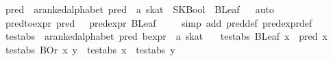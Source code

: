 \begin{isabellebody}
\isanewline
{}\isamarkupfalse%
\ pred\ {}{}\ {}{}a{}{}ranked{}alphabet\ pred\ {}\ {}a\ skat{}\ \ {}SKBool\ {}\ BLeaf{}%
\isadelimproof
\ %
\endisadelimproof
%
\isatagproof
{}\isamarkupfalse%
\ auto%
\endisatagproof
{\isafoldproof}%
%
\isadelimproof
%
\endisadelimproof
\isanewline
\isanewline
{}\isamarkupfalse%
\ pred{}to{}expr{}\ {}pred\ {}\ {}\ pred{}expr\ {}BLeaf\ {}{}{}\isanewline
%
\isadelimproof
\ \ %
\endisadelimproof
%
\isatagproof
{}\isamarkupfalse%
\ {}simp\ add{}\ pred{}def\ pred{}expr{}def{}%
\endisatagproof
{\isafoldproof}%
%
\isadelimproof
\isanewline
%
\endisadelimproof
\isanewline
{}\isamarkupfalse%
\ test{}abs\ {}{}\ {}{}a{}{}ranked{}alphabet\ pred\ bexpr\ {}\ {}a\ skat{}\ \isanewline
\ \ {}test{}abs\ {}BLeaf\ x{}\ {}\ pred\ x{}\isanewline
{}\ {}test{}abs\ {}BOr\ x\ y{}\ {}\ test{}abs\ x\ {}\ test{}abs\ y{}\isanewline

\end{isabellebody}
